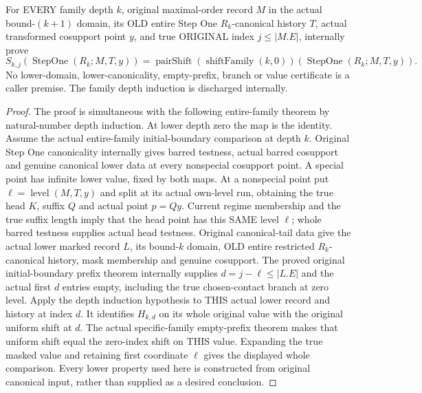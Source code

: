 \begin{theorem}
\label{hir:original-recursive-canonical-step-initial-boundary-compatibility}
\leanok
For EVERY family depth $k$, original maximal-order record $M$ in the actual
bound-$(k+1)$ domain, its OLD entire Step One $R_k$-canonical history $T$,
actual transformed cosupport point $y$, and true ORIGINAL index
$j\leq |M.E|$, internally prove
\[
 S_{k,j}(\operatorname{StepOne}(R_k;M,T,y))
 =\operatorname{pairShift}(\operatorname{shiftFamily}(k,0))
    (\operatorname{StepOne}(R_k;M,T,y)).
\]
No lower-domain, lower-canonicality, empty-prefix, branch or value certificate
is a caller premise. The family depth induction is discharged internally.
\end{theorem}
\begin{proof}
The proof is simultaneous with the following entire-family theorem by
natural-number depth induction. At lower depth zero the map is the identity.
Assume the actual entire-family initial-boundary comparison at depth $k$.
Original Step One canonicality internally gives barred testness, actual
barred cosupport and genuine canonical lower data at every nonspecial
cosupport point. A special point has infinite lower value, fixed by both
maps. At a nonspecial point put $\ell=\operatorname{level}(M,T,y)$ and
split at its actual own-level run, obtaining the true head $K$, suffix $Q$
and actual point $p=Qy$. Current regime membership and the true suffix
length imply that the head point has this SAME level $\ell$; whole barred
testness supplies actual head testness. Original canonical-tail data give
the actual lower marked record $L$, its bound-$k$ domain, OLD entire
restricted $R_k$-canonical history, mask membership and genuine cosupport.
The proved original initial-boundary prefix theorem internally supplies
$d=j-\ell\leq |L.E|$ and the actual first $d$ entries empty, including the
true chosen-contact branch at zero level. Apply the depth induction hypothesis
to THIS actual lower record and history at index $d$. It identifies
$H_{k,d}$ on its whole original value with the original uniform shift at
$d$. The actual specific-family empty-prefix theorem makes that uniform
shift equal the zero-index shift on THIS value. Expanding the true masked
value and retaining first coordinate $\ell$ gives the displayed whole
comparison. Every lower property used here is constructed from original
canonical input, rather than supplied as a desired conclusion.
\end{proof}

